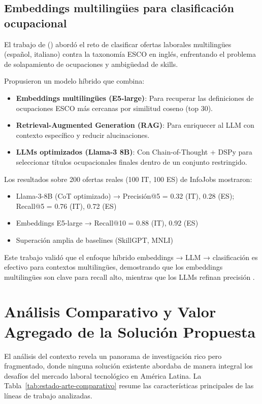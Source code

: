 \subsection{Embeddings multilingües para clasificación ocupacional}

El trabajo de \citeauthor{kavas2024} (\citeyear{kavas2024}) abordó el reto de clasificar ofertas laborales multilingües (español, italiano) contra la taxonomía ESCO en inglés, enfrentando el problema de solapamiento de ocupaciones y ambigüedad de skills.

Propusieron un modelo híbrido que combina:

\begin{itemize}
    \item \textbf{Embeddings multilingües (E5-large)}: Para recuperar las definiciones de ocupaciones ESCO más cercanas por similitud coseno (top 30).
    \item \textbf{Retrieval-Augmented Generation (RAG)}: Para enriquecer al LLM con contexto específico y reducir alucinaciones.
    \item \textbf{LLMs optimizados (Llama-3 8B)}: Con Chain-of-Thought + DSPy para seleccionar títulos ocupacionales finales dentro de un conjunto restringido.
\end{itemize}

Los resultados sobre 200 ofertas reales (100 IT, 100 ES) de InfoJobs mostraron:

\begin{itemize}
    \item Llama-3-8B (CoT optimizado) → Precisión@5 = 0.32 (IT), 0.28 (ES); Recall@5 = 0.76 (IT), 0.72 (ES)
    \item Embeddings E5-large → Recall@10 = 0.88 (IT), 0.92 (ES)
    \item Superación amplia de baselines (SkillGPT, MNLI) \parencite{kavas2024}
\end{itemize}

Este trabajo validó que el enfoque híbrido embeddings → LLM → clasificación es efectivo para contextos multilingües, demostrando que los embeddings multilingües son clave para recall alto, mientras que los LLMs refinan precisión \parencite{kavas2024}.

\section{Análisis Comparativo y Valor Agregado de la Solución Propuesta}

El análisis del contexto revela un panorama de investigación rico pero fragmentado, donde ninguna solución existente abordaba de manera integral los desafíos del mercado laboral tecnológico en América Latina. La Tabla~\ref{tab:estado-arte-comparativo} resume las características principales de las líneas de trabajo analizadas.


